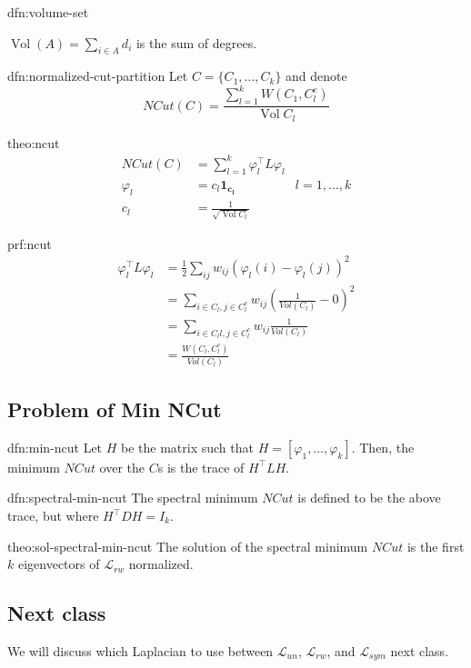 \documentclass[12pt]{article}
\theoremstyle{plain}
\DeclareMathOperator*{\vol}{Vol}
\begin{document}
\begin{dfn}{dfn:volume-set}

$ \vol(A) = \sum_{i \in A} d_i $ is the sum of degrees.

\end{dfn}

\begin{dfn}{dfn:normalized-cut-partition}
Let $ C = \{ C_1, \ldots, C_k \} $ and denote
\[
NCut(C) = \frac{ \sum_{l = 1}^k W(C_1, C_l^c) }{ \vol{C_l} }
\]

\end{dfn}

\begin{theo}[NCut]{theo:ncut}
  \begin{align*}
    NCut(C) &= \sum_{l = 1}^{k} \varphi_l^{\intercal} L \varphi_{l} \\
    \varphi_l &= c_{l} \mathbf{1_{c_{l}}} & l = 1, \ldots, k \\
    c_l &= \frac{1}{\sqrt{\vol{C_l}}}
  \end{align*}
\end{theo}

\begin{prf}{prf:ncut}
	\begin{align*}
		\varphi_l^{\intercal} L \varphi_{l} &= \frac{1}{2} \sum_{ij} w_{ij}(\varphi_l(i) - \varphi_l(j))^2 \\
		&= \sum_{i \in C_l, j \in C_l^c} w_{ij} (\frac{1}{Vol(C_l)} - 0)^2 \\
		&= \sum_{i \in C_ll, j \in C_l^c} w_{ij} \frac{1}{Vol(C_l)} \\
		&= \frac{W(C_l,C_l^c)}{Vol(C_l)}
	\end{align*}
\end{prf}

\subsection{Problem of Min NCut}
\begin{dfn}{dfn:min-ncut}
	Let $ H $ be the matrix such that $ H = [\varphi_1, \ldots, \varphi_k] $.
	Then, the minimum $ NCut $ over the $ C $s is the trace of $ H^{\intercal} L H $.
\end{dfn}
\begin{dfn}{dfn:spectral-min-ncut}
The spectral minimum $ NCut $ is defined to be the above trace, but where $ H^{\intercal} D H = I_{k} $.
\end{dfn}
\begin{theo}{theo:sol-spectral-min-ncut}
  The solution of the spectral minimum $ NCut $ is the first $ k $ eigenvectors of $ \mathcal{L}_{rw} $ normalized.
\end{theo}

\subsection{Next class}

We will discuss which Laplacian to use between $\mathcal{L}_{un}$, $\mathcal{L}_{rw}$, and $\mathcal{L}_{sym}$ next class.

{}

\end{document}
